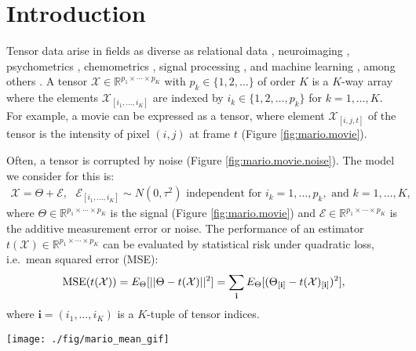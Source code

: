 \section{Introduction}
\label{sec:intro}

Tensor data arise in fields as diverse as relational data \citep{hoff2014multilinear}, neuroimaging \citep{zhang2014tensor,li2015parsimonious}, psychometrics \citep{kiers2001three}, chemometrics \citep{smilde2005multi,bro2006review}, signal processing \citep{cichockitensor}, and machine learning \citep{tao2005supervised}, among others \citep{kroonenberg2008applied}.
A tensor $\mathcal{X} \in \mathbb{R}^{p_1\times\cdots\times p_K}$ with $p_k \in \{1,2,\ldots\}$ of order $K$ is a $K$-way array where the elements $\mathcal{X}_{[i_1,\ldots,i_K]}$ are indexed by $i_k \in \{1,2,\ldots,p_k\}$ for $k = 1,\ldots,K$. For example, a movie can be expressed as a tensor, where element $\mathcal{X}_{[i,j,t]}$ of the tensor is the intensity of pixel $(i,j)$ at frame $t$ (Figure \ref{fig:mario.movie}). 

Often, a tensor is corrupted by noise (Figure \ref{fig:mario.movie.noise}). The model we consider for this is:
\begin{align}
  \label{equation:normal.model}
  \mathcal{X} = \Theta + \mathcal{E},\text{  } \mathcal{E}_{[i_1,\ldots,i_K]} \sim N(0,\tau^2) \text{ independent for } i_k = 1,\ldots,p_k, \text{ and } k = 1,\ldots,K,
\end{align}
where $\Theta \in \mathbb{R}^{p_1\times\cdots\times p_K}$ is the signal (Figure \ref{fig:mario.movie}) and $\mathcal{E} \in \mathbb{R}^{p_1\times\cdots\times p_K}$ is the additive measurement error or noise. The performance of an estimator $t(\mathcal{X})\in \mathbb{R}^{p_1\times\cdots\times p_K}$ can be evaluated by statistical risk under quadratic loss, i.e.\  mean squared error (MSE):
\begin{align}
  \label{equation:mse}
  \operatorname*{MSE}(t(\mathcal{X})) = E_{\Theta}[||\Theta - t(\mathcal{X})||^2] = \sum_{\mathbf{i}} E_{\Theta}[(\Theta_{[\mathbf{i}]} - t(\mathcal{X})_{[\mathbf{i}]})^2],
\end{align}
where $\mathbf{i} = (i_1,\ldots,i_K)$ is a $K$-tuple of tensor indices.

\begin{figure*}
\begin{center}
\texttt{[image: ./fig/mario\_mean\_gif]}
\caption{Frames of a movie \citep{marioimage}.}
\label{fig:mario.movie}
\end{center}
\end{figure*}

